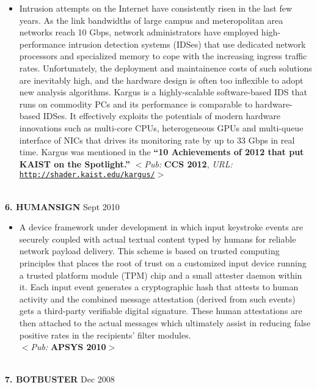\documentclass[10pt]{article}
\newenvironment{outerlist}[1][\enskip\textbullet]%
        {\begin{itemize}[#1]}{\end{itemize}%
         \vspace{-.6\baselineskip}}
\begin{document}
\begin{outerlist}
\item[] {Intrusion attempts on the Internet have consistently risen in the last few years. As the link bandwidths of large campus and meteropolitan area networks reach 10 Gbps, network administrators have employed high-performance intrusion detection systems (IDSes) that use dedicated network processors and specialized memory to cope with the increasing ingress traffic rates. Unfortunately, the deployment and maintainence costs of such solutions are inevitably high, and the hardware design is often too inflexible to adopt new analysis algorithms. Kargus is a highly-scalable software-based IDS that runs on commodity PCs and its performance is comparable to hardware-based IDSes. It effectively exploits the potentials of modern hardware innovations such as multi-core CPUs, heterogeneous GPUs and multi-queue interface of NICs that drives its monitoring rate by up to 33 Gbps in real time. Kargus was mentioned in the {\bf ``10 Achievements of 2012 that put KAIST on the Spotlight.''} $<$\textit{Pub:} {\bf CCS 2012}, \textit{URL:} \href{http://shader.kaist.edu/kargus/}{\texttt{http://shader.kaist.edu/kargus/}}$>$}
\end{outerlist}
\ \\
{\textbf{6. H{\footnotesize UMAN}S{\footnotesize IGN}}}
        \hfill {Sept 2010}
\begin{outerlist}
\item[] {A device framework under development in which input keystroke events are securely coupled with actual textual content typed by humans for reliable network payload delivery. This scheme is based on trusted computing principles that places the root of trust on a customized input device running a trusted platform module (TPM) chip and a small attester daemon within it. Each input event generates a cryptographic hash that attests to human activity and the combined message attestation (derived from such events) gets a third-party verifiable digital signature. These human attestations are then attached to the actual messages which ultimately assist in reducing false positive rates in the recipients' filter modules. \\ $<$\textit{Pub:} {\bf APSYS 2010}$>$}
\end{outerlist}
\ \\ 
{\textbf{7. B{\footnotesize OTBUSTER}}}%
	\hfill {Dec 2008}
\end{document}

